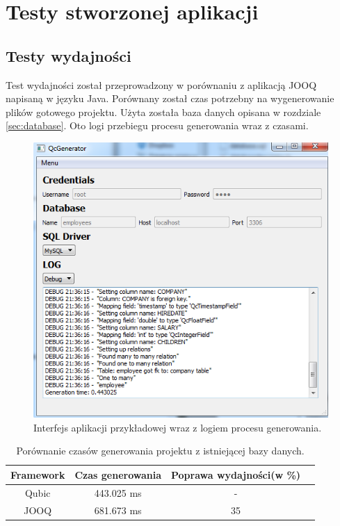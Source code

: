 \documentclass[12pt]{report}
\let\oldaddcontentsline\addcontentsline
\newcommand{\lstinputcplusplus}[2][]{{%
  \renewcommand{\lstlistingname}{C++ Code}%
  \renewcommand{\addcontentsline}[3]{\oldaddcontentsline{loc}{##2}{##3}}%
}}
\begin{document}
\begin{framed}
\lstinputcplusplus[caption={QcGenerator}]{additional/qcgenerator.h}
\end{framed}

\section{Testy stworzonej aplikacji}
\subsection{Testy wydajności}
Test wydajności został przeprowadzony w porównaniu z aplikacją JOOQ napisaną w języku Java. Porównany został czas potrzebny na wygenerowanie plików gotowego projektu. Użyta została baza danych opisana w rozdziale \ref{sec:database}. Oto logi przebiegu procesu generowania wraz z czasami.

\begin{framed}

\end{framed}

\begin{figure}[!ht]
	\centering
	\includegraphics[width=1.1\textwidth]{images/qubic-gen.png}
	\caption{Interfejs aplikacji przykładowej wraz z logiem procesu generowania.}
\end{figure}
\FloatBarrier

\begin{table}[!ht]
\centering
    \begin{tabular}{cccc}
    \hline
    Framework & Czas generowania & Poprawa wydajności(w \%) \\ \hline
    Qubic & 443.025 ms &  - \\ \hline
    JOOQ & 681.673 ms & 35 \\ \hline
    \end{tabular}
    \caption{Porównanie czasów generowania projektu z istniejącej bazy danych.}
\end{table}
\end{document}

